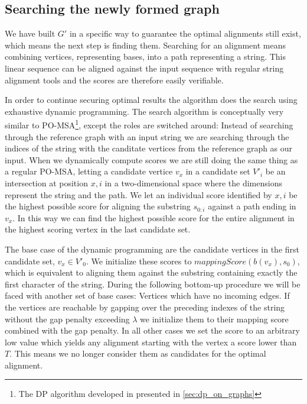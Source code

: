 \documentclass[thesis.tex]{subfiles}
\begin{document}
\subsection{Searching the newly formed graph}
We have built $G'$ in a specific way to guarantee the optimal alignments still exist, which means the next step is finding them. Searching for an alignment means combining vertices, representing bases, into a path representing a string. This linear sequence can be aligned against the input sequence with regular string alignment tools and the scores are therefore easily verifiable.\\
\par\noindent
In order to continue securing optimal results the algorithm does the search using exhaustive dynamic programming. The search algorithm is conceptually very similar to PO-MSA\footnote{The DP algorithm developed in \cite{multiple_sequence_alignment_using_partial_order_graphs} presented in \ref{sec:dp_on_graphs}}, except the roles are switched around: Instead of searching through the reference graph with an input string we are searching through the indices of the string with the canditate vertices from the reference graph as our input. When we dynamically compute scores we are still doing the same thing as a regular PO-MSA, letting a candidate vertice $v_x$ in a candidate set $V'_i$ be an intersection at position $x, i$ in a two-dimensional space where the dimensions represent the string and the path. We let an individual score identified by $x, i$ be the highest possible score for aligning the substring $s_{0:i}$ against a path ending in $v_x$. In this way we can find the highest possible score for the entire alignment in the highest scoring vertex in the last candidate set.\\
\par\noindent
The base case of the dynamic programming are the candidate vertices in the first candidate set, $v_x \in V'_0$. We initialize these scores to $mappingScore(b(v_x), s_0)$, which is equivalent to aligning them against the substring containing exactly the first character of the string. During the following bottom-up procedure we will be faced with another set of base cases: Vertices which have no incoming edges. If the vertices are reachable by gapping over the preceding indexes of the string without the gap penalty exceeding $\lambda$ we initialize them to their mapping score combined with the gap penalty. In all other cases we set the score to an arbitrary low value which yields any alignment starting with the vertex a score lower than $T$. This means we no longer consider them as candidates for the optimal alignment.\\
\end{document}
